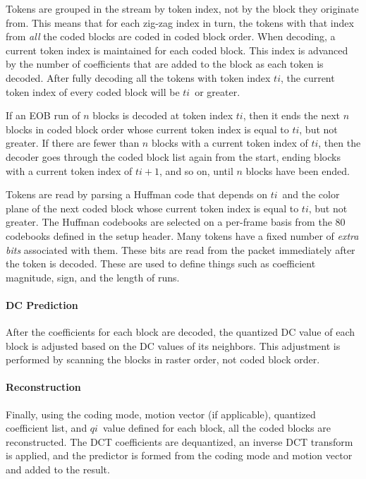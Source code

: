 \documentclass[11pt,letterpaper]{book}
\newcommand{\idx}[1]{{\ensuremath{\mathit{#1}}}}
\newcommand{\qi}{\idx{qi}}
\newcommand{\ti}{\idx{ti}}
\newcommand{\term}[1]{{\em #1}}
\numberwithin{equation}{chapter}
\numberwithin{figure}{chapter}
\numberwithin{table}{chapter}
\begin{document}
Tokens are grouped in the stream by token index, not by the block they
 originate from.
This means that for each zig-zag index in turn, the tokens with that index from
 {\em all} the coded blocks are coded in coded block order.
When decoding, a current token index is maintained for each coded block.
This index is advanced by the number of coefficients that are added to the
 block as each token is decoded.
After fully decoding all the tokens with token index \ti, the current token
 index of every coded block will be \ti\ or greater.

If an EOB run of $n$ blocks is decoded at token index \ti, then it ends the
 next $n$ blocks in coded block order whose current token index is equal to
 \ti, but not greater.
If there are fewer than $n$ blocks with a current token index of \ti, then the
 decoder goes through the coded block list again from the start, ending blocks
 with a current token index of $\ti+1$, and so on, until $n$ blocks have been
 ended.

Tokens are read by parsing a Huffman code that depends on \ti\ and the color
 plane of the next coded block whose current token index is equal to \ti, but
 not greater.
The Huffman codebooks are selected on a per-frame basis from the 80 codebooks
 defined in the setup header.
Many tokens have a fixed number of \term{extra bits} associated with them.
These bits are read from the packet immediately after the token is decoded.
These are used to define things such as coefficient magnitude, sign, and the
 length of runs.

\paragraph{DC Prediction}

After the coefficients for each block are decoded, the quantized DC value of
 each block is adjusted based on the DC values of its neighbors.
This adjustment is performed by scanning the blocks in raster order, not coded
 block order.

\paragraph{Reconstruction}

Finally, using the coding mode, motion vector (if applicable), quantized
 coefficient list, and \qi\ value defined for each block, all the coded blocks
 are reconstructed.
The DCT coefficients are dequantized, an inverse DCT transform is applied, and
 the predictor is formed from the coding mode and motion vector and added to
 the result.
\end{document}
